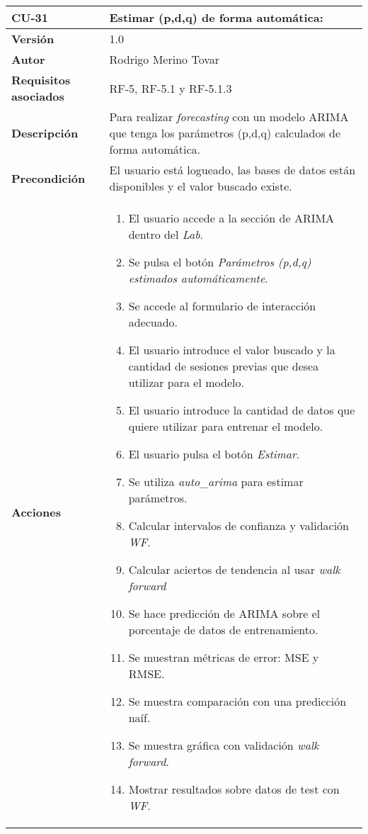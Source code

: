 \begin{table}[p]
	\centering
	\begin{tabularx}{\linewidth}{ p{} p{} }
		\toprule
		\textbf{CU-31}    & \textbf{Estimar (p,d,q) de forma automática:}\\
		\toprule
		\textbf{Versión}              & 1.0    \\
		\textbf{Autor}                & Rodrigo Merino Tovar \\
		\textbf{Requisitos asociados} & RF-5, RF-5.1 y RF-5.1.3  \\
		\textbf{Descripción}          & Para realizar \emph{forecasting} con un modelo ARIMA que tenga los parámetros (p,d,q) calculados de forma automática.\\
		\textbf{Precondición}         & El usuario está logueado, las bases de datos están disponibles y el valor buscado existe.  \\
		\textbf{Acciones}             &
		\begin{enumerate}
			\def\labelenumi{\arabic{enumi}.}
			\tightlist 
			\item El usuario accede a la sección de ARIMA dentro del \emph{Lab}.
			\item Se pulsa el botón \emph{Parámetros (p,d,q) estimados automáticamente}. 
			\item Se accede al formulario de interacción adecuado. 
			\item El usuario introduce el valor buscado y la cantidad de sesiones previas que desea utilizar para el modelo. 
			\item El usuario introduce la cantidad de datos que quiere utilizar para entrenar el modelo.
			\item El usuario pulsa el botón \emph{Estimar}.
			\item Se utiliza \emph{auto\_arima} para estimar parámetros.
			\item Calcular intervalos de confianza y validación \emph{WF}.
			\item Calcular aciertos de tendencia al usar \emph{walk forward}
			\item Se hace predicción de ARIMA sobre el porcentaje de datos de entrenamiento.
			\item Se muestran métricas de error: MSE y RMSE. 
			\item Se muestra comparación con una predicción naíf.			
			\item Se muestra gráfica con validación \emph{walk forward}.
			\item Mostrar resultados sobre datos de test con \emph{WF}.

\end{enumerate}
\end{tabularx}
\end{table}
